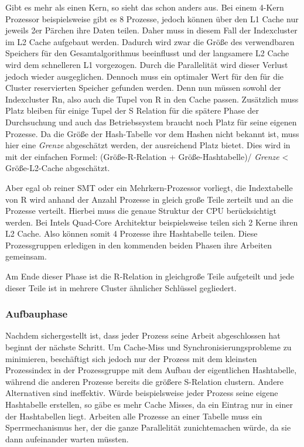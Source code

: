 Gibt es mehr als einen Kern, so sieht das schon anders aus. Bei einem 4-Kern Prozessor beispielsweise gibt es 8 Prozesse, jedoch können über den L1 Cache nur jeweils 2er Pärchen ihre Daten teilen. Daher muss in diesem Fall der Indexcluster im L2 Cache aufgebaut werden. Dadurch wird zwar die Größe des verwendbaren Speichers für den Gesamtalgorithmus beeinflusst und der langsamere L2 Cache wird dem schnelleren L1 vorgezogen. Durch die Parallelität wird dieser Verlust jedoch wieder ausgeglichen. Dennoch muss ein optimaler Wert für den für die Cluster reservierten Speicher gefunden werden. Denn nun müssen sowohl der Indexcluster Rn, also auch die Tupel von R in den Cache passen. Zusätzlich muss Platz bleiben für einige Tupel der S Relation für die spätere Phase der Durchsuchung und auch das Betriebssystem braucht noch Platz für seine eigenen Prozesse. Da die Größe der Hash-Tabelle vor dem Hashen nicht bekannt ist, muss hier eine \textit{Grenze} abgeschätzt werden, der ausreichend Platz bietet. Dies wird in \cite{GARCIA} mit der einfachen Formel: (Größe-R-Relation + Größe-Hashtabelle)/ \textit{Grenze} < Größe-L2-Cache abgeschätzt.

Aber egal ob reiner SMT oder ein Mehrkern-Prozessor vorliegt, die Indextabelle von R wird anhand der Anzahl Prozesse in gleich große Teile zerteilt und an die Prozesse verteilt. Hierbei muss die genaue Struktur der CPU berücksichtigt werden. Bei Intels Quad-Core Architektur beispielsweise teilen sich 2 Kerne ihren L2 Cache. Also können somit 4 Prozesse ihre Hashtabelle teilen. Diese Prozessgruppen erledigen in den kommenden beiden Phasen ihre Arbeiten gemeinsam.

Am Ende dieser Phase ist die R-Relation in gleichgroße Teile aufgeteilt und jede dieser Teile ist in mehrere Cluster ähnlicher Schlüssel gegliedert.

\subsubsection*{Aufbauphase}
\label{sec:AA_Hash-Join_Aufbauphase}

Nachdem sichergestellt ist, dass jeder Prozess seine Arbeit abgeschlossen hat beginnt der nächste Schritt. Um Cache-Miss und Synchronisierungsprobleme zu minimieren, beschäftigt sich jedoch nur der Prozess mit dem kleinsten Prozessindex in der Prozessgruppe mit dem Aufbau der eigentlichen Hashtabelle, während die anderen Prozesse bereits die größere S-Relation clustern. Andere Alternativen sind ineffektiv. Würde beispielsweise jeder Prozess seine eigene Hashtabelle erstellen, so gäbe es mehr Cache Misses, da ein Eintrag nur in einer der Hashtabellen liegt. Arbeiten alle Prozesse an einer Tabelle muss ein Sperrmechanismus her, der die ganze Parallelität zunichtemachen würde, da sie dann aufeinander warten müssten.

